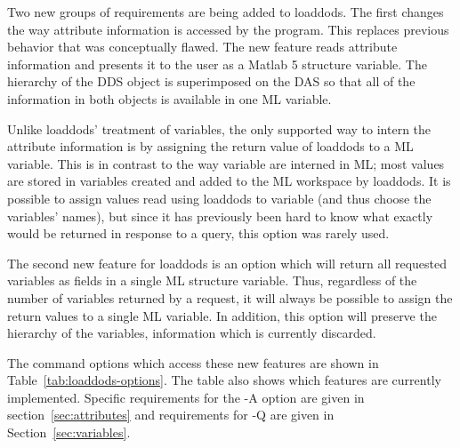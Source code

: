 \documentclass{article}
\begin{document}
Two new groups of requirements are being added to loaddods. The first changes
the way attribute information is accessed by the program. This replaces
previous behavior that was conceptually flawed. The new feature reads
attribute information and presents it to the user as a Matlab 5 structure
variable. The hierarchy of the DDS object is superimposed on the DAS so that
all of the information in both objects is available in one ML variable.

Unlike loaddods' treatment of variables, the only supported way to intern the
attribute information is by assigning the return value of loaddods to a ML
variable. This is in contrast to the way variable are interned in ML; most
values are stored in variables created and added to the ML workspace by
loaddods. It is possible to assign values read using loaddods to variable
(and thus choose the variables' names), but since it has previously been
hard to know what exactly would be returned in response to a query, this
option was rarely used.

The second new feature for loaddods is an option which will return all
requested variables as fields in a single ML structure variable. Thus,
regardless of the number of variables returned by a request, it will always
be possible to assign the return values to a single ML variable. In addition,
this option will preserve the hierarchy of the variables, information which
is currently discarded.

The command options which access these new features are shown in
Table~\ref{tab:loaddods-options}. The table also shows which features are
currently implemented. Specific requirements for the -A option are given in
section~\ref{sec:attributes} and requirements for -Q are given in
Section~\ref{sec:variables}. 
\end{document}
